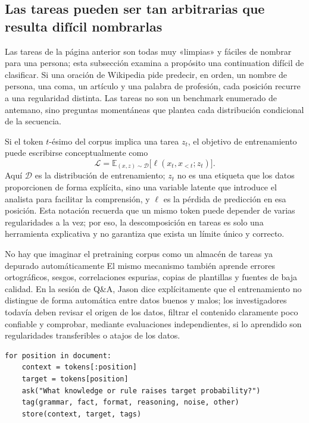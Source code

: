 \subsection{Las tareas pueden ser tan arbitrarias que resulta difícil nombrarlas}

Las tareas de la página anterior son todas muy «limpias» y fáciles de nombrar para una persona; esta subsección examina a propósito una continuation difícil de clasificar. Si una oración de Wikipedia pide predecir, en orden, un nombre de persona, una coma, un artículo y una palabra de profesión, cada posición recurre a una regularidad distinta. Las tareas no son un benchmark enumerado de antemano, sino preguntas momentáneas que plantea cada distribución condicional de la secuencia.


Si el token $t$-ésimo del corpus implica una tarea $z_t$, el objetivo de entrenamiento puede escribirse conceptualmente como
\[
\mathcal{L}=\mathbb{E}_{(x,z)\sim\mathcal{D}}\bigl[\ell(x_t,x_{<t};z_t)\bigr].
\]
Aquí $\mathcal{D}$ es la distribución de entrenamiento; $z_t$ no es una etiqueta que los datos proporcionen de forma explícita, sino una variable latente que introduce el analista para facilitar la comprensión, y $\ell$ es la pérdida de predicción en esa posición. Esta notación recuerda que un mismo token puede depender de varias regularidades a la vez; por eso, la descomposición en tareas es solo una herramienta explicativa y no garantiza que exista un límite único y correcto.

\begin{warningbox}{No hay que imaginar el pretraining corpus como un almacén de tareas ya depurado automáticamente}
El mismo mecanismo también aprende errores ortográficos, sesgos, correlaciones espurias, copias de plantillas y fuentes de baja calidad. En la sesión de Q\&A, Jason dice explícitamente que el entrenamiento no distingue de forma automática entre datos buenos y malos; los investigadores todavía deben revisar el origen de los datos, filtrar el contenido claramente poco confiable y comprobar, mediante evaluaciones independientes, si lo aprendido son regularidades transferibles o atajos de los datos.
\end{warningbox}

\begin{lstlisting}[caption={Pseudocódigo para descomponer un texto en latent-task probes}]
for position in document:
    context = tokens[:position]
    target = tokens[position]
    ask("What knowledge or rule raises target probability?")
    tag(grammar, fact, format, reasoning, noise, other)
    store(context, target, tags)
\end{lstlisting}

